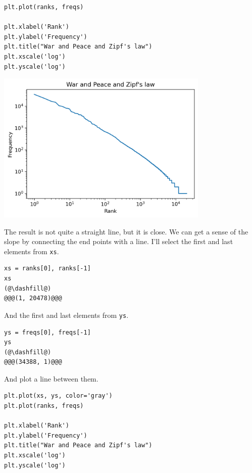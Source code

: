 \begin{lstlisting}[]
plt.plot(ranks, freqs)

plt.xlabel('Rank')
plt.ylabel('Frequency')
plt.title("War and Peace and Zipf's law")
plt.xscale('log')
plt.yscale('log')
\end{lstlisting}

\begin{center}
\includegraphics[width=4in]{chapters/06_plotting_files/06_plotting_78_0.png}
\end{center}

The result is not quite a straight line, but it is close. We can get a
sense of the slope by connecting the end points with a line. I'll select
the first and last elements from \passthrough{\lstinline!xs!}.

\begin{lstlisting}[]
xs = ranks[0], ranks[-1]
xs
(@\dashfill@)
@@@(1, 20478)@@@
\end{lstlisting}

And the first and last elements from \passthrough{\lstinline!ys!}.

\begin{lstlisting}[]
ys = freqs[0], freqs[-1]
ys
(@\dashfill@)
@@@(34388, 1)@@@
\end{lstlisting}

And plot a line between them.

\begin{lstlisting}[]
plt.plot(xs, ys, color='gray')
plt.plot(ranks, freqs)

plt.xlabel('Rank')
plt.ylabel('Frequency')
plt.title("War and Peace and Zipf's law")
plt.xscale('log')
plt.yscale('log')
\end{lstlisting}

